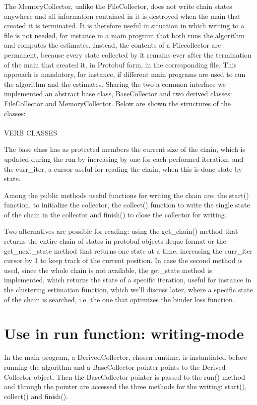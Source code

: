 The MemoryCollector, unlike the FileCollector, does not write chain states anywhere and all information contained in it is destroyed when the main that created it is terminated. It is therefore useful in situation in which writing to a file is not needed, for instance in a main program that both runs the algorithm and computes the estimates.
Instead, the contents of a Filecollector are permanent, because every state collected by it remains ever after the termination of the main that created it, in Protobuf form, in the corresponding file. This approach is mandatory, for instance, if different main programs are used to run the algorithm and the estimates. 
Sharing the two a common interface we implemented an abstract base class, BaseCollector and two derived classes: FileCollector and MemoryCollector.
Below are shown the structures of the classes:
\\\\ VERB CLASSES


The base class has as protected members the current size of the chain, which is updated during the run by increasing by one for each performed  iteration, and the curr\_iter, a cursor useful for reading the chain, when this is done state by state.

Among the public methods useful functions for writing the chain are: the start() function, to initialize the collector, the collect() function to write the single state of the chain in the collector and finish() to close the collector for writing. 

Two alternatives are possible for reading: using the get\_chain() method that returns the entire chain of states in protobuf-objects deque format or the get\_next\_state method that returns one state at a time, increasing the curr\_iter cursor by 1 to keep track of the current position. In case the second method is used, since the whole chain is not available, the get\_state method is implemented, which returns the state of a specific iteration, useful for instance in the clustering estimation function, which we'll discuss later, where a specific state of the chain is searched, i.e. the one that optimizes the binder loss function.

\section{Use in run function: writing-mode}
In the main program, a DerivedCollector, chosen runtime, is instantiated before running the algorithm and a BaseCollector pointer points to the Derived Collector object.
Then the BaseCollector pointer is passed to the run() method and through the pointer are accessed the three methods for the writing: start(), collect() and finish().


